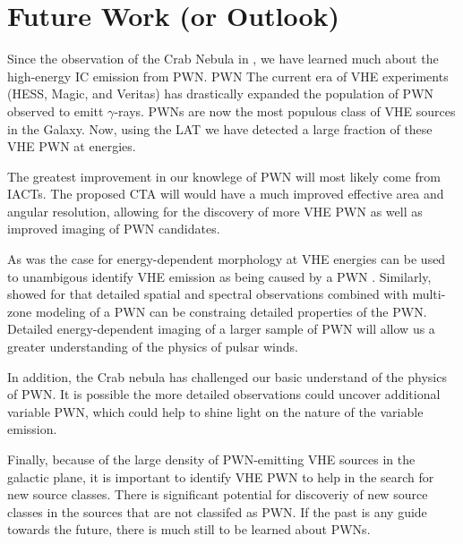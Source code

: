 
\chapter{Future Work (or Outlook)}

Since the observation of the Crab Nebula
in \citeyear{weekes_1989a_observation-gamma}
\cite{weekes_1989a_observation-gamma}, we have learned much about the
high-energy \ac{IC} emission from \ac{PWN}. \ac{PWN} The current era of
\ac{VHE} experiments (\ac{HESS}, Magic, and Veritas) has drastically
expanded the population of \ac{PWN} observed to emitt $\gamma$-rays.
\acp{PWN} are now the most populous class of \ac{VHE} sources in the
Galaxy.  Now, using the \ac{LAT} we have detected a large fraction of
these \ac{VHE} \ac{PWN} at \gev energies.

The greatest improvement in our knowlege of \ac{PWN} will most likely come
from \acp{IACT}. The proposed \ac{CTA} \citep{actis_2011a_design-concepts}
will would have a much improved effective area and angular resolution,
allowing for the discovery of more \ac{VHE} \ac{PWN} as well as improved
imaging of \ac{PWN} candidates.

As was the case for  energy-dependent morphology at \ac{VHE}
energies can be used to unambigous identify \ac{VHE} emission as being
caused by a \ac{PWN} \citep{aharonian_2006a_energy-dependent}.  Similarly,
\cite{van-etten_2011a_multi-zone-modeling} showed for  that
detailed spatial and spectral observations combined with multi-zone
modeling of a \ac{PWN} can be constraing detailed properties of
the \ac{PWN}.  Detailed energy-dependent imaging of a larger sample
of \ac{PWN} will allow us a greater understanding of the physics of
pulsar winds.

In addition, the Crab nebula has challenged our basic understand of the
physics of \ac{PWN}. It is possible the more detailed observations could
uncover additional variable \ac{PWN}, which could help to shine light
on the nature of the variable emission.

Finally, because of the large density of \ac{PWN}-emitting \ac{VHE}
sources in the galactic plane, it is important to identify \ac{VHE}
\ac{PWN} to help in the search for new source classes.  There is
significant potential for discoveriy of new source classes in the sources
that are not classifed as \ac{PWN}.  If the past is any guide towards
the future, there is much still to be learned about \acp{PWN}.
